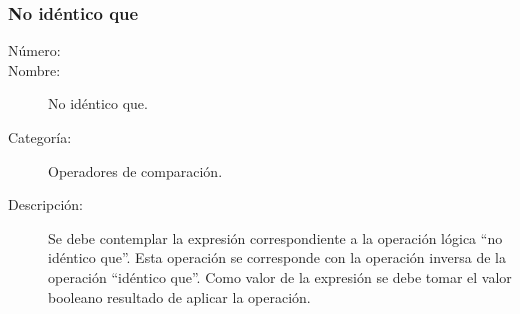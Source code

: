 \subsubsection{No idéntico que}
	\begin{description}
		\item [Número:] \cn
		\item [Nombre:] No idéntico que.
		\item [Categoría:] Operadores de comparación.
		\item [Descripción:] Se debe contemplar la expresión correspondiente a la operación lógica ``no idéntico que''. Esta operación
		se corresponde con la operación inversa de la operación ``idéntico que''. Como valor
		de la expresión se debe tomar el valor booleano resultado de aplicar la operación.
	\end {description}
